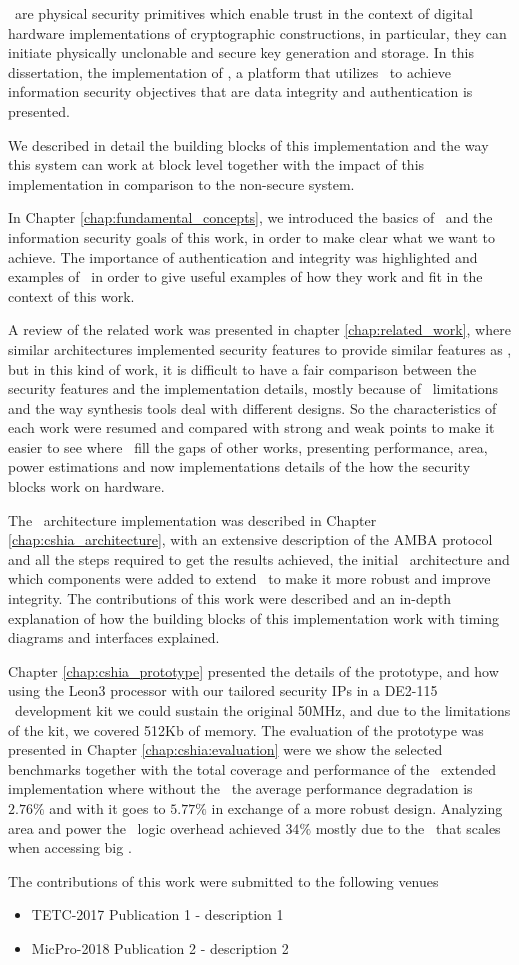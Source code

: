 \pufs~are physical security primitives which enable trust in the context of digital hardware implementations of cryptographic constructions, in particular, they can initiate physically unclonable and secure key generation and storage. In this dissertation, the implementation of \cshia, a platform that utilizes \pufs~to achieve information security objectives that are data integrity and authentication is presented. 

We described in detail the building blocks of this implementation and the way this system can work at block level together with the impact of this implementation in comparison to the non-secure system.

In  Chapter \ref{chap:fundamental_concepts}, we introduced the basics of \pufs~and the information security goals of this work, in order to make clear what we want to achieve. The importance of authentication and integrity was highlighted and examples of \pufs~in order to give useful examples of how they work and fit in the context of this work.

A review of the related work was presented in chapter \ref{chap:related_work}, where similar architectures implemented security features to provide similar features as \cshia, but in this kind of work, it is difficult to have a fair comparison  between  the security features and the implementation details, mostly because of \fpga~limitations and the way synthesis tools deal with different designs. So the characteristics of each work were resumed and compared with strong and weak points to make it easier to see where \cshia~fill the gaps of other works, presenting performance, area, power estimations and now implementations details of the how the security blocks work on hardware.

The \cshia~architecture implementation was described in Chapter \ref{chap:cshia_architecture}, with an extensive description of the AMBA protocol and all the steps required to get the results achieved, the initial \cshia~architecture and which components were added to extend \cshia~to make it more robust and improve integrity. The contributions of this work were described and an in-depth explanation of how the building blocks of this implementation work with timing diagrams and interfaces explained.


Chapter \ref{chap:cshia_prototype} presented the details of the prototype, and how using the Leon3 processor with our tailored security IPs in a DE2-115 \fpga~development kit we could sustain the original 50MHz, and due to the limitations of the kit, we covered 512Kb of memory. The evaluation of the prototype was presented in Chapter \ref{chap:cshia:evaluation}  were we show the selected benchmarks together with the total coverage and performance of the \cshia~extended implementation where without the \mt~the average  performance degradation is $2.76\%$ and with  it goes to $5.77\%$ in exchange of a more robust design. Analyzing area and power the \cshia~logic overhead achieved $34\%$ mostly due to the \sbuf~that scales when accessing big \slines.

  The contributions of this work were submitted to the following venues 
 \begin{itemize}
 \item{TETC-2017} Publication 1  - description 1
 \item{MicPro-2018} Publication 2 - description 2
 \end{itemize}